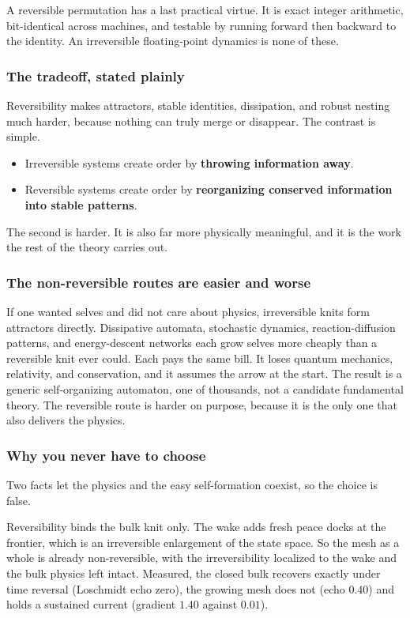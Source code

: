 A reversible permutation has a last practical virtue. It is exact integer arithmetic, bit-identical across machines, and testable by running forward then backward to the identity. An irreversible floating-point dynamics is none of these.

\subsubsection{The tradeoff, stated plainly}

Reversibility makes attractors, stable identities, dissipation, and robust nesting much harder, because nothing can truly merge or disappear. The contrast is simple.

\begin{itemize}
\item Irreversible systems create order by \textbf{throwing information away}.
\item Reversible systems create order by \textbf{reorganizing conserved information into stable patterns}.
\end{itemize}

The second is harder. It is also far more physically meaningful, and it is the work the rest of the theory carries out.

\subsubsection{The non-reversible routes are easier and worse}

If one wanted selves and did not care about physics, irreversible knits form attractors directly. Dissipative automata, stochastic dynamics, reaction-diffusion patterns, and energy-descent networks each grow selves more cheaply than a reversible knit ever could. Each pays the same bill. It loses quantum mechanics, relativity, and conservation, and it assumes the arrow at the start. The result is a generic self-organizing automaton, one of thousands, not a candidate fundamental theory. The reversible route is harder on purpose, because it is the only one that also delivers the physics.

\subsubsection{Why you never have to choose}

Two facts let the physics and the easy self-formation coexist, so the choice is false.

\begin{lemma}
Reversibility binds the bulk knit only. The wake adds fresh peace docks at the frontier, which is an irreversible enlargement of the state space. So the mesh as a whole is already non-reversible, with the irreversibility localized to the wake and the bulk physics left intact. Measured, the closed bulk recovers exactly under time reversal (Loschmidt echo zero), the growing mesh does not (echo $0.40$) and holds a sustained current (gradient $1.40$ against $0.01$).
\end{lemma}

